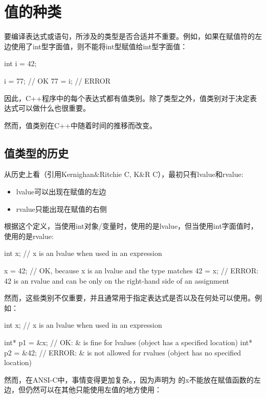 \section{值的种类}
要编译表达式或语句，所涉及的类型是否合适并不重要。例如，如果在赋值符的左边使用了int型字面值，则不能将int型赋值给int型字面值：

\begin{cppcode}
int i = 42;

i = 77; // OK
77 = i; // ERROR
\end{cppcode}

因此，C++程序中的每个表达式都有值类别。除了类型之外，值类别对于决定表达式可以做什么也很重要。

然而，值类别在C++中随着时间的推移而改变。

\subsection{值类型的历史}

从历史上看（引用Kernighan\&Ritchie C, K\&R C），最初只有lvalue和rvalue:

\begin{itemize}
	\item lvalue可以出现在赋值的左边
	\item rvalue只能出现在赋值的右侧
\end{itemize}

根据这个定义，当使用int对象/变量时，使用的是lvalue，但当使用int字面值时，使用的是rvalue:

\begin{cppcode}
int x; // x is an lvalue when used in an expression

x = 42; // OK, because x is an lvalue and the type matches
42 = x; // ERROR: 42 is an rvalue and can be only on the right-hand side of an assignment
\end{cppcode}

然而，这些类别不仅重要，并且通常用于指定表达式是否以及在何处可以使用。例如：

\begin{cppcode}
int x; // x is an lvalue when used in an expression

int* p1 = &x; // OK: & is fine for lvalues (object has a specified location)
int* p2 = &42; // ERROR: & is not allowed for rvalues (object has no specified location)
\end{cppcode}

然而，在ANSI-C中，事情变得更加复杂。，因为声明为  的x不能放在赋值函数的左边，但仍然可以在其他只能使用左值的地方使用：

